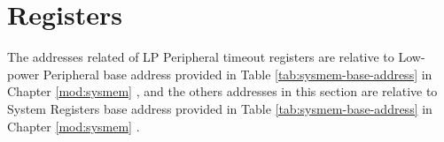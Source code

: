 \documentclass[main\_\_EN.tex]{subfiles}
\begin{document}


\clearpage
\section{Registers}

The addresses related of LP Peripheral timeout registers are relative to Low-power Peripheral base address provided in Table \ref{tab:sysmem-base-address} in Chapter \ref{mod:sysmem} \textit{}, and the others addresses in this section are relative to System Registers base address provided in Table \ref{tab:sysmem-base-address} in Chapter \ref{mod:sysmem} \textit{}.


\end{document}
